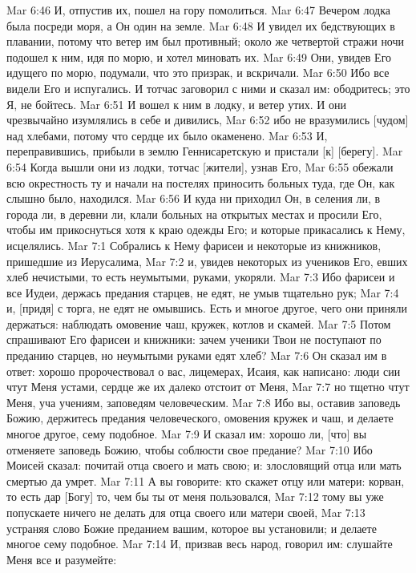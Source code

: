 Mar 6:46  И, отпустив их, пошел на гору помолиться.
Mar 6:47  Вечером лодка была посреди моря, а Он один на земле.
Mar 6:48  И увидел их бедствующих в плавании, потому что ветер им был противный; около же четвертой стражи ночи подошел к ним, идя по морю, и хотел миновать их.
Mar 6:49  Они, увидев Его идущего по морю, подумали, что это призрак, и вскричали.
Mar 6:50  Ибо все видели Его и испугались. И тотчас заговорил с ними и сказал им: ободритесь; это Я, не бойтесь.
Mar 6:51  И вошел к ним в лодку, и ветер утих. И они чрезвычайно изумлялись в себе и дивились,
Mar 6:52  ибо не вразумились [чудом] над хлебами, потому что сердце их было окаменено.
Mar 6:53  И, переправившись, прибыли в землю Геннисаретскую и пристали [к] [берегу].
Mar 6:54  Когда вышли они из лодки, тотчас [жители], узнав Его,
Mar 6:55  обежали всю окрестность ту и начали на постелях приносить больных туда, где Он, как слышно было, находился.
Mar 6:56  И куда ни приходил Он, в селения ли, в города ли, в деревни ли, клали больных на открытых местах и просили Его, чтобы им прикоснуться хотя к краю одежды Его; и которые прикасались к Нему, исцелялись.
Mar 7:1  Собрались к Нему фарисеи и некоторые из книжников, пришедшие из Иерусалима,
Mar 7:2  и, увидев некоторых из учеников Его, евших хлеб нечистыми, то есть неумытыми, руками, укоряли.
Mar 7:3  Ибо фарисеи и все Иудеи, держась предания старцев, не едят, не умыв тщательно рук;
Mar 7:4  и, [придя] с торга, не едят не омывшись. Есть и многое другое, чего они приняли держаться: наблюдать омовение чаш, кружек, котлов и скамей.
Mar 7:5  Потом спрашивают Его фарисеи и книжники: зачем ученики Твои не поступают по преданию старцев, но неумытыми руками едят хлеб?
Mar 7:6  Он сказал им в ответ: хорошо пророчествовал о вас, лицемерах, Исаия, как написано: люди сии чтут Меня устами, сердце же их далеко отстоит от Меня,
Mar 7:7  но тщетно чтут Меня, уча учениям, заповедям человеческим.
Mar 7:8  Ибо вы, оставив заповедь Божию, держитесь предания человеческого, омовения кружек и чаш, и делаете многое другое, сему подобное.
Mar 7:9  И сказал им: хорошо ли, [что] вы отменяете заповедь Божию, чтобы соблюсти свое предание?
Mar 7:10  Ибо Моисей сказал: почитай отца своего и мать свою; и: злословящий отца или мать смертью да умрет.
Mar 7:11  А вы говорите: кто скажет отцу или матери: корван, то есть дар [Богу] то, чем бы ты от меня пользовался,
Mar 7:12  тому вы уже попускаете ничего не делать для отца своего или матери своей,
Mar 7:13  устраняя слово Божие преданием вашим, которое вы установили; и делаете многое сему подобное.
Mar 7:14  И, призвав весь народ, говорил им: слушайте Меня все и разумейте:
